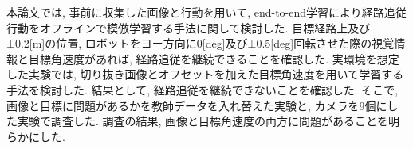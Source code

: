 
本論文では, 事前に収集した画像と行動を用いて, end-to-end学習により経路追従行動をオフラインで模倣学習する手法に関して検討した. 目標経路上及び±0.2[m]の位置, ロボットをヨー方向に0[deg]及び±0.5[deg]回転させた際の視覚情報と目標角速度があれば, 経路追従を継続できることを確認した. 実環境を想定した実験では, 切り抜き画像とオフセットを加えた目標角速度を用いて学習する手法を検討した. 結果として, 経路追従を継続できないことを確認した. そこで, 画像と目標に問題があるかを教師データを入れ替えた実験と, カメラを9個にした実験で調査した. 調査の結果, 画像と目標角速度の両方に問題があることを明らかにした. 